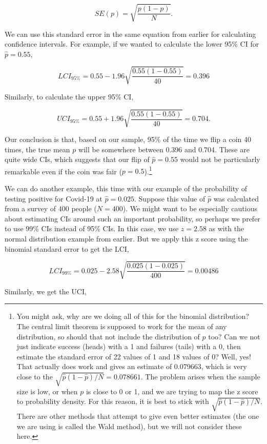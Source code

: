 \documentclass[
]{scrbook}
\begin{document}
\[SE(p) = \sqrt{\frac{p\left(1 - p\right)}{N}}.\]

We can use this standard error in the same equation from earlier for calculating confidence intervals.
For example, if we wanted to calculate the lower 95\% CI for \(\hat{p} = 0.55\),

\[LCI_{95\%} = 0.55 - 1.96 \sqrt{\frac{0.55\left(1 - 0.55\right)}{40}} = 0.396\]

Similarly, to calculate the upper 95\% CI,

\[UCI_{95\%} = 0.55 + 1.96 \sqrt{\frac{0.55\left(1 - 0.55\right)}{40}} = 0.704.\]

Our conclusion is that, based on our sample, 95\% of the time we flip a coin 40 times, the true mean \(p\) will be somewhere between 0.396 and 0.704.
These are quite wide CIs, which suggests that our flip of \(\hat{p} = 0.55\) would not be particularly remarkable even if the coin was fair (\(p = 0.5\)).\footnote{You might ask, why are we doing all of this for the binomial distribution? The central limit theorem is supposed to work for the mean of any distribution, so should that not include the distribution of \(p\) too? Can we not just indicate success (heads) with a 1 and failures (tails) with a 0, then estimate the standard error of 22 values of 1 and 18 values of 0? Well, yes! That actually does work and gives an estimate of 0.079663, which is very close to the \(\sqrt{\hat{p}(1-\hat{p})/N} = 0.078661\). The problem arises when the sample size is low, or when \(p\) is close to 0 or 1, and we are trying to map the z score to probability density. For this reason, it is best to stick with \(\sqrt{\hat{p}(1-\hat{p})/N}\). There are other methods that attempt to give even better estimates (the one we are using is called the Wald method), but we will not consider these here.}

We can do another example, this time with our example of the probability of testing positive for Covid-19 at \(\hat{p} = 0.025\).
Suppose this value of \(\hat{p}\) was calculated from a survey of 400 people (\(N = 400\)).
We might want to be especially cautious about estimating CIs around such an important probability, so perhaps we prefer to use 99\% CIs instead of 95\% CIs.
In this case, we use \(z = 2.58\) as with the normal distribution example from earlier.
But we apply this z score using the binomial standard error to get the LCI,

\[LCI_{99\%} = 0.025 - 2.58 \sqrt{\frac{0.025\left(1 - 0.025\right)}{400}} = 0.00486\]

Similarly, we get the UCI,
\end{document}

